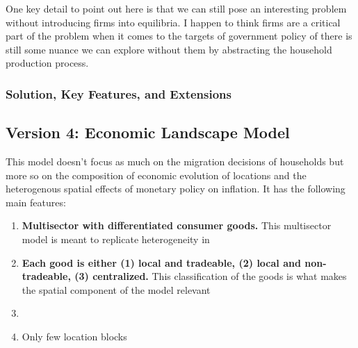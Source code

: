 \documentclass[11pt,english]{article}
\begin{document}
\noindent One key detail to point out here is that we can still pose an interesting problem without introducing firms into equilibria. I happen to think firms are a critical part of the problem when it comes to the targets of government policy of there is still some nuance we can explore without them by abstracting the household production process.

\subsubsection{Solution, Key Features, and Extensions}

\subsection{Version 4: Economic Landscape Model}

This model doesn't focus as much on the migration decisions of households but more so on the composition of economic evolution of locations and the heterogenous spatial effects of monetary policy on inflation. It has the following main features:
\begin{enumerate}
\item \textbf{Multisector with differentiated consumer goods.} This multisector model is meant to replicate heterogeneity in 

\item \textbf{Each good is either (1) local and tradeable, (2) local and non-tradeable, (3) centralized.} This classification of the goods is what makes the spatial component of the model relevant

\item 

\item Only few location blocks
\end{enumerate}


\newpage




\end{document}
